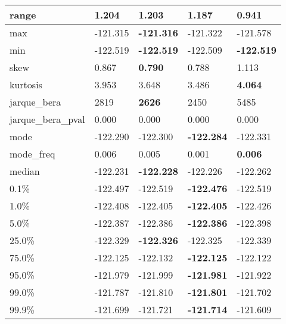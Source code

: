 \begin{table}[H]
\begin{tabular}{|l|m{10em}|m{10em}|m{10em}|m{10em}|}
\hline range & 1.204 & \bfseries 1.203 & 1.187 & \cellcolor[rgb]{0.9, 0.54, 0.52} 0.941 \\
\hline max & -121.315 & \bfseries -121.316 & -121.322 & \cellcolor[rgb]{0.9, 0.54, 0.52} -121.578 \\
\hline min & -122.519 & \bfseries -122.519 & \cellcolor[rgb]{0.9, 0.54, 0.52} -122.509 & \bfseries -122.519 \\
\hline skew & 0.867 & \bfseries 0.790 & 0.788 & \cellcolor[rgb]{0.9, 0.54, 0.52} 1.113 \\
\hline kurtosis & 3.953 & 3.648 & \cellcolor[rgb]{0.9, 0.54, 0.52} 3.486 & \bfseries 4.064 \\
\hline jarque\_bera & 2819 & \bfseries 2626 & 2450 & \cellcolor[rgb]{0.9, 0.54, 0.52} 5485 \\
\hline jarque\_bera\_pval & 0.000 & 0.000 & 0.000 & 0.000 \\
\hline mode & -122.290 & -122.300 & \bfseries -122.284 & \cellcolor[rgb]{0.9, 0.54, 0.52} -122.331 \\
\hline mode\_freq & 0.006 & 0.005 & \cellcolor[rgb]{0.9, 0.54, 0.52} 0.001 & \bfseries 0.006 \\
\hline median & -122.231 & \bfseries -122.228 & -122.226 & \cellcolor[rgb]{0.9, 0.54, 0.52} -122.262 \\
\hline 0.1\% & -122.497 & \cellcolor[rgb]{0.9, 0.54, 0.52} -122.519 & \bfseries -122.476 & \cellcolor[rgb]{0.9, 0.54, 0.52} -122.519 \\
\hline 1.0\% & -122.408 & -122.405 & \bfseries -122.405 & \cellcolor[rgb]{0.9, 0.54, 0.52} -122.426 \\
\hline 5.0\% & -122.387 & -122.386 & \bfseries -122.386 & \cellcolor[rgb]{0.9, 0.54, 0.52} -122.398 \\
\hline 25.0\% & -122.329 & \bfseries -122.326 & -122.325 & \cellcolor[rgb]{0.9, 0.54, 0.52} -122.339 \\
\hline 75.0\% & -122.125 & \cellcolor[rgb]{0.9, 0.54, 0.52} -122.132 & \bfseries -122.125 & -122.122 \\
\hline 95.0\% & -121.979 & -121.999 & \bfseries -121.981 & \cellcolor[rgb]{0.9, 0.54, 0.52} -121.922 \\
\hline 99.0\% & -121.787 & -121.810 & \bfseries -121.801 & \cellcolor[rgb]{0.9, 0.54, 0.52} -121.702 \\
\hline 99.9\% & -121.699 & -121.721 & \bfseries -121.714 & \cellcolor[rgb]{0.9, 0.54, 0.52} -121.609 \\
\hline
\end{tabular}
\end{table}
